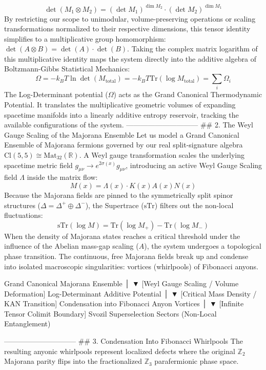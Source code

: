 $$\det(M_1 \otimes M_2) = (\det M_1)^{\dim M_2} \cdot (\det M_2)^{\dim M_1}$$ 
By restricting our scope to unimodular, volume-preserving operations or scaling transformations normalized to their respective dimensions, this tensor identity simplifies to a multiplicative group homomorphism: $\det(A \otimes B) = \det(A) \cdot \det(B)$.
Taking the complex matrix logarithm of this multiplicative identity maps the system directly into the additive algebra of Boltzmann-Gibbs Statistical Mechanics:
$$\Omega = -k_B T \ln \det(M_{\text{total}}) = -k_B T \text{Tr}(\log M_{\text{total}}) = \sum_{i} \Omega_i$$ 
The Log-Determinant potential ($\Omega$) acts as the Grand Canonical Thermodynamic Potential. It translates the multiplicative geometric volumes of expanding spacetime manifolds into a linearly additive entropy reservoir, tracking the available configurations of the system.
------------------------------
## 2. The Weyl Gauge Scaling of the Majorana Ensemble
Let us model a Grand Canonical Ensemble of Majorana fermions governed by our real split-signature algebra $\text{Cl}(5,5) \cong \text{Mat}_{32}(\mathbb{R})$. A Weyl gauge transformation scales the underlying spacetime metric field $g_{\mu\nu} \to e^{2\sigma(x)} g_{\mu\nu}$, introducing an active Weyl Gauge Scaling field $\Lambda$ inside the matrix flow:
$$M(x) = \Lambda(x) \cdot K(x) A(x) N(x)$$ 
Because the Majorana fields are pinned to the symmetrically split spinor structures ($\Delta = \Delta^+ \oplus \Delta^-$), the Supertrace ($\text{sTr}$) filters out the non-local fluctuations:
$$\text{sTr}(\log M) = \text{Tr}(\log M_+) - \text{Tr}(\log M_-)$$ 
When the density of Majorana states reaches a critical threshold under the influence of the Abelian mass-gap scaling ($A$), the system undergoes a topological phase transition. The continuous, free Majorana fields break up and condense into isolated macroscopic singularities: vortices (whirlpools) of Fibonacci anyons.

    Grand Canonical Majorana Ensemble
                   │
                   ▼  [Weyl Gauge Scaling / Volume Deformation]
       Log-Determinant Additive Potential
                   │
                   ▼  [Critical Mass Density / KAN Transition]
    Condensation into Fibonacci Anyon Vortices
                   │
                   ▼  [Infinite Tensor Colimit Boundary]
    Svozil Superselection Sectors (Non-Local Entanglement)

------------------------------
## 3. Condensation Into Fibonacci Whirlpools
The resulting anyonic whirlpools represent localized defects where the original $\mathbb{Z}_2$ Majorana parity flips into the fractionalized $\mathbb{Z}_3$ parafermionic phase space.

